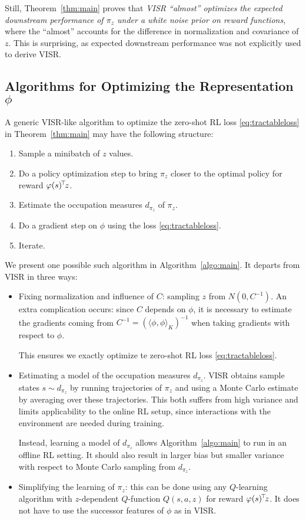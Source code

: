 \documentclass[11pt,a4paper]{article}
\begin{document}
Still, Theorem~\ref{thm:main} proves that \emph{VISR ``almost'' optimizes the
expected downstream performance of $\pi_z$ under a white noise prior on
reward functions}, where the ``almost'' accounts for the difference in
normalization and covariance of $z$. This is surprising, as expected downstream
performance was not explicitly used to derive VISR.

\subsection{Algorithms for Optimizing the Representation $\phi$}
\label{sec:phiopt}

A generic VISR-like algorithm to optimize the zero-shot RL loss
\eqref{eq:tractableloss} in Theorem~\ref{thm:main} may have the following
structure:
\begin{enumerate}
\item Sample a minibatch of $z$ values.
\item Do a policy optimization step to bring $\pi_z$ closer to the
optimal policy for reward $\varphi(s)^{\!\top}\!z$.
\item Estimate the occupation measures $d_{\pi_z}$ of $\pi_z$.
\item Do a gradient step on $\phi$ using the loss
\eqref{eq:tractableloss}.
\item Iterate.
\end{enumerate}

We present one possible such algorithm in Algorithm~\ref{algo:main}. It
departs from VISR in three ways:
\begin{itemize}
\item Fixing normalization and influence of $C$: sampling  $z$ from
$N(0,C^{-1})$. An extra complication occurs: since $C$ depends on $\phi$,
it is necessary
to estimate the gradients coming from $C^{-1}=(\langle
\phi,\phi\rangle_K)^{-1}$ when taking gradients with respect to $\phi$.

This ensures we exactly optimize te zero-shot RL loss
\eqref{eq:tractableloss}.

\item Estimating a model of the occupation measures $d_{\pi_z}$.  VISR
obtains sample states $s\sim d_{\pi_z}$ by running trajectories of
$\pi_z$ and using a Monte Carlo estimate by averaging over these
trajectories. This both suffers from high variance and limits
applicability to the online RL setup, since interactions with the
environment are needed during training.

Instead, learning a model of $d_{\pi_z}$ allows Algorithm~\ref{algo:main}
to run in an offline RL setting. It should also result in larger bias but
smaller variance with respect to Monte Carlo sampling from $d_{\pi_z}$.

\item Simplifying the learning of $\pi_z$: this can be done using any
$Q$-learning algorithm with $z$-dependent $Q$-function $Q(s,a,z)$ for 
reward $\varphi(s)^{\!\top}\!z$. It does not have to use the successor
features of $\phi$ as in VISR.
\end{itemize}
\end{document}
